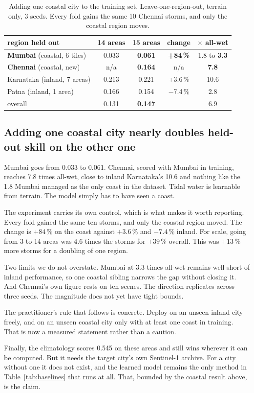\begin{table}[!t]
\centering
\caption{Adding one coastal city to the training set. Leave-one-region-out, terrain only, 3 seeds.
Every fold gains the same 10 Chennai storms, and only the coastal region moves.}
\label{tab:coastal}
\begin{tabular}{lcccc}
\toprule
region held out & 14 areas & 15 areas & change & $\times$ all-wet \\
\midrule
\textbf{Mumbai} (coastal, 6 tiles) & 0.033 & \textbf{0.061} & \textbf{+84\,\%} & 1.8 to \textbf{3.3} \\
\textbf{Chennai} (coastal, new)    & n/a   & \textbf{0.164} & n/a             & \textbf{7.8} \\
Karnataka (inland, 7 areas)        & 0.213 & 0.221 & +3.6\,\% & 10.6 \\
Patna (inland, 1 area)             & 0.166 & 0.154 & $-$7.4\,\% & 2.8 \\
\midrule
overall                            & 0.131 & \textbf{0.147} & & 6.9 \\
\bottomrule
\end{tabular}
\end{table}

\subsection{Adding one coastal city nearly doubles held-out skill on the other one}
Mumbai goes from 0.033 to 0.061. Chennai, scored with Mumbai in training, reaches 7.8 times
all-wet, close to inland Karnataka's 10.6 and nothing like the 1.8 Mumbai managed as the only coast
in the dataset. Tidal water is learnable from terrain. The model simply has to have seen a coast.

The experiment carries its own control, which is what makes it worth reporting. Every fold gained
the same ten storms, and only the coastal region moved. The change is $+84\,\%$ on the coast
against $+3.6\,\%$ and $-7.4\,\%$ inland. For scale, going from 3 to 14 areas was 4.6 times the
storms for $+39\,\%$ overall. This was $+13\,\%$ more storms for a doubling of one region.

Two limits we do not overstate. Mumbai at 3.3 times all-wet remains well short of inland
performance, so one coastal sibling narrows the gap without closing it. And Chennai's own figure
rests on ten scenes. The direction replicates across three seeds. The magnitude does not yet have
tight bounds.

The practitioner's rule that follows is concrete. Deploy on an unseen inland city freely, and on an
unseen coastal city only with at least one coast in training. That is now a measured statement
rather than a caution.

Finally, the climatology scores 0.545 on these areas and still wins wherever it can be computed.
But it needs the target city's own Sentinel-1 archive. For a city without one it does not exist,
and the learned model remains the only method in Table~\ref{tab:baselines} that runs at all. That,
bounded by the coastal result above, is the claim.
